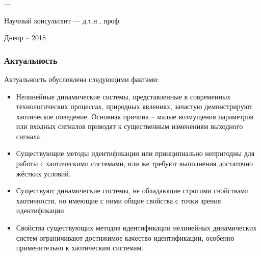 \documentclass[14pt,handout,utf8]{beamer}
\author{\dissauthorRu}
\title[~]{\booknameRu}
\begin{document}
\begin{frame}
  \frametitle{}
  \begin{center}
    {\Large \color{blue} \booknameRu}

    \vfill

    {\dissSpecId --- \dissSpecRu}

    \vfill

    {\large \dissauthorMain}

    \vfill

    Научный консультант --- д.т.н., проф. \superRu

    \vfill

    Днепр -- 2018
  \end{center}
\end{frame}


\begin{frame}
  \frametitle{Актуальность}

  Актуальность обусловлена следующими фактами:

  \begin{itemize}

    \item
      Нелинейные динамические системы, представленные в современных
      технологических процессах, природных явлениях, зачастую
      демонстрируют хаотическое поведение.
      Основная причина -- малые возмущения параметров или входных сигналов
      приводят к существенным изменениям выходного сигнала.

    \item
      Существующие методы идентификации или принципиально непригодны для
      работы с хаотическими системами, или же требуют выполнения
      достаточно жёстких условий.

    \item
      Существуют динамические системы, не обладающие строгими свойствами хаотичности,
      но имеющие с ними общие свойства с точки зрения идентификации.

    \item
      Свойства существующих методов идентификации нелинейных динамических систем
      ограничивают достижимое качество идентификации,
      особенно применительно к хаотическим системам.

  \end{itemize}


\end{frame}
\end{document}

